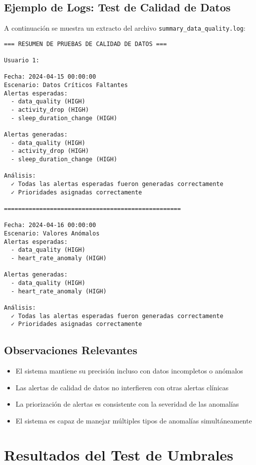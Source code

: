\subsection{Ejemplo de Logs: Test de Calidad de Datos}

A continuación se muestra un extracto del archivo \texttt{summary\_data\_quality.log}:

\begin{verbatim}
=== RESUMEN DE PRUEBAS DE CALIDAD DE DATOS ===

Usuario 1:

Fecha: 2024-04-15 00:00:00
Escenario: Datos Críticos Faltantes
Alertas esperadas:
  - data_quality (HIGH)
  - activity_drop (HIGH)
  - sleep_duration_change (HIGH)

Alertas generadas:
  - data_quality (HIGH)
  - activity_drop (HIGH)
  - sleep_duration_change (HIGH)

Análisis:
  ✓ Todas las alertas esperadas fueron generadas correctamente
  ✓ Prioridades asignadas correctamente

==================================================

Fecha: 2024-04-16 00:00:00
Escenario: Valores Anómalos
Alertas esperadas:
  - data_quality (HIGH)
  - heart_rate_anomaly (HIGH)

Alertas generadas:
  - data_quality (HIGH)
  - heart_rate_anomaly (HIGH)

Análisis:
  ✓ Todas las alertas esperadas fueron generadas correctamente
  ✓ Prioridades asignadas correctamente
\end{verbatim}

\subsection{Observaciones Relevantes}

\begin{itemize}
    \item El sistema mantiene su precisión incluso con datos incompletos o anómalos
    \item Las alertas de calidad de datos no interfieren con otras alertas clínicas
    \item La priorización de alertas es consistente con la severidad de las anomalías
    \item El sistema es capaz de manejar múltiples tipos de anomalías simultáneamente
\end{itemize}

\section{Resultados del Test de Umbrales}
\label{anexo:pruebas:umbrales}

